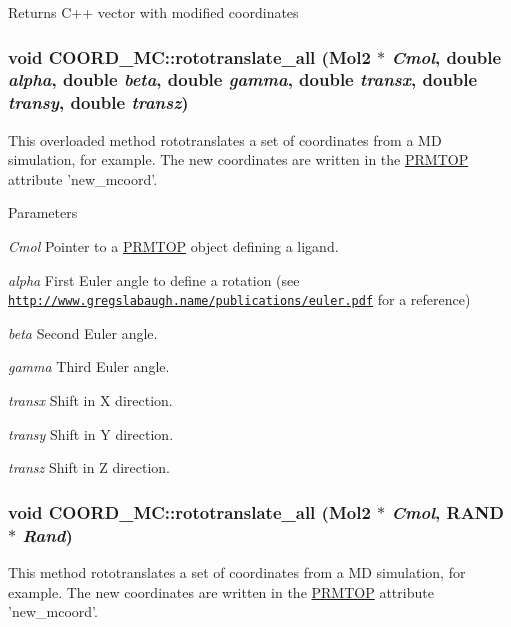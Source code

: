 \begin{DoxyReturn}{Returns}
C++ vector with modified coordinates 
\end{DoxyReturn}
\hypertarget{classCOORD__MC_ab54ac0814f32c1b752807a062546bcd3}{
\subsubsection[{rototranslate\_\-all}]{\setlength{\rightskip}{0pt plus 5cm}void COORD\_\-MC::rototranslate\_\-all ({\bf Mol2} $\ast$ {\em Cmol}, \/  double {\em alpha}, \/  double {\em beta}, \/  double {\em gamma}, \/  double {\em transx}, \/  double {\em transy}, \/  double {\em transz})}}
\label{classCOORD__MC_ab54ac0814f32c1b752807a062546bcd3}
This overloaded method rototranslates a set of coordinates from a MD simulation, for example. The new coordinates are written in the \hyperlink{classPRMTOP}{PRMTOP} attribute 'new\_\-mcoord'.


\begin{DoxyParams}{Parameters}
\item[{\em Cmol}]Pointer to a \hyperlink{classPRMTOP}{PRMTOP} object defining a ligand. \item[{\em alpha}]First Euler angle to define a rotation (see \href{http://www.gregslabaugh.name/publications/euler.pdf}{\tt http://www.gregslabaugh.name/publications/euler.pdf} for a reference) \item[{\em beta}]Second Euler angle. \item[{\em gamma}]Third Euler angle. \item[{\em transx}]Shift in X direction. \item[{\em transy}]Shift in Y direction. \item[{\em transz}]Shift in Z direction. \end{DoxyParams}
\hypertarget{classCOORD__MC_a589bdc525228164c9d212312f262e3c8}{
\subsubsection[{rototranslate\_\-all}]{\setlength{\rightskip}{0pt plus 5cm}void COORD\_\-MC::rototranslate\_\-all ({\bf Mol2} $\ast$ {\em Cmol}, \/  {\bf RAND} $\ast$ {\em Rand})}}
\label{classCOORD__MC_a589bdc525228164c9d212312f262e3c8}
This method rototranslates a set of coordinates from a MD simulation, for example. The new coordinates are written in the \hyperlink{classPRMTOP}{PRMTOP} attribute 'new\_\-mcoord'.



